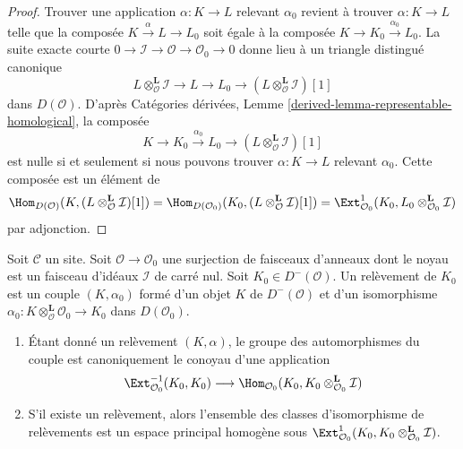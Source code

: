 \begin{proof}
Trouver une application $\alpha : K \to L$ relevant $\alpha_0$ revient à
trouver $\alpha : K \to L$ telle que la composée
$K \xrightarrow{\alpha} L \to L_0$ soit égale à la composée
$K \to K_0 \xrightarrow{\alpha_0} L_0$.
La suite exacte courte
$0 \to \mathcal{I} \to \mathcal{O} \to \mathcal{O}_0 \to 0$ donne lieu à un
triangle distingué canonique
$$
L \otimes_\mathcal{O}^\mathbf{L} \mathcal{I} \to
L \to
L_0 \to
(L \otimes_\mathcal{O}^\mathbf{L} \mathcal{I})[1]
$$
dans $D(\mathcal{O})$.
D'après Catégories dérivées,
Lemme \ref{derived-lemma-representable-homological}, la composée
$$
K \to K_0 \xrightarrow{\alpha_0} L_0 \to
(L \otimes_\mathcal{O}^\mathbf{L} \mathcal{I})[1]
$$
est nulle si et seulement si nous pouvons trouver
$\alpha : K \to L$ relevant $\alpha_0$. Cette composée est un élément de
$$
\Hom_{D(\mathcal{O})}(K, (L \otimes_\mathcal{O}^\mathbf{L} \mathcal{I})[1]) =
\Hom_{D(\mathcal{O}_0)}(K_0,
(L \otimes_\mathcal{O}^\mathbf{L} \mathcal{I})[1]) =
\Ext^1_{\mathcal{O}_0}(K_0,
L_0 \otimes_{\mathcal{O}_0}^\mathbf{L} \mathcal{I})
$$
par adjonction.
\end{proof}

\begin{lemma}
\label{lemma-first-order-defos-complex}
Soit $\mathcal{C}$ un site. Soit $\mathcal{O} \to \mathcal{O}_0$ une
surjection de faisceaux d'anneaux dont le noyau est un faisceau d'idéaux
$\mathcal{I}$ de carré nul. Soit $K_0 \in D^-(\mathcal{O})$.
Un relèvement de $K_0$ est un couple $(K, \alpha_0)$ formé d'un objet $K$ de
$D^-(\mathcal{O})$ et d'un isomorphisme
$\alpha_0 : K \otimes_\mathcal{O}^\mathbf{L} \mathcal{O}_0 \to K_0$ dans
$D(\mathcal{O}_0)$.
\begin{enumerate}
\item Étant donné un relèvement $(K, \alpha)$, le groupe des automorphismes du
couple est canoniquement le conoyau d'une application
$$
\Ext^{-1}_{\mathcal{O}_0}(K_0, K_0)
\longrightarrow
\Hom_{\mathcal{O}_0}(K_0, K_0 \otimes_{\mathcal{O}_0}^\mathbf{L} \mathcal{I})
$$
\item S'il existe un relèvement, alors l'ensemble des classes d'isomorphisme de
relèvements est un espace principal homogène sous
$\Ext^1_{\mathcal{O}_0}(K_0,
K_0 \otimes_{\mathcal{O}_0}^\mathbf{L} \mathcal{I})$.
\end{enumerate}
\end{lemma}

